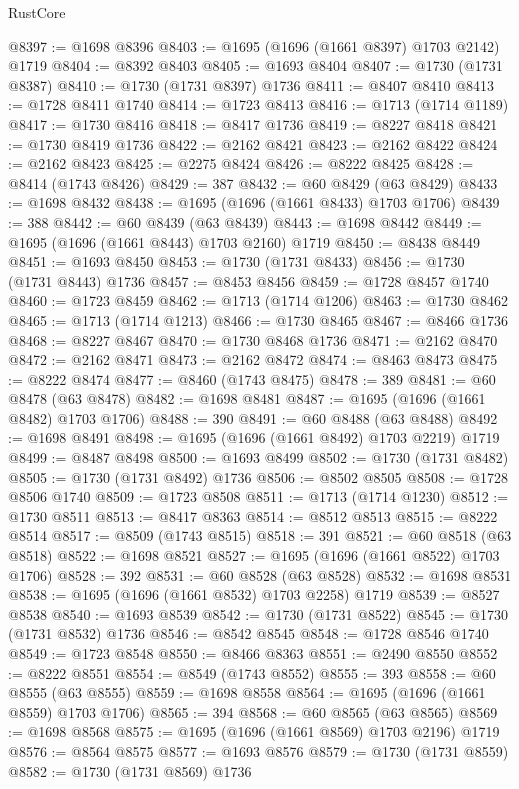 \begin{lexlean}{RustCore}
\begin{coremodule}
@8397 := @1698 @8396
@8403 := @1695 (@1696 (@1661 @8397) @1703 @2142) @1719
@8404 := @8392 @8403
@8405 := @1693 @8404
@8407 := @1730 (@1731 @8387)
@8410 := @1730 (@1731 @8397) @1736
@8411 := @8407 @8410
@8413 := @1728 @8411 @1740
@8414 := @1723 @8413
@8416 := @1713 (@1714 @1189)
@8417 := @1730 @8416
@8418 := @8417 @1736
@8419 := @8227 @8418
@8421 := @1730 @8419 @1736
@8422 := @2162 @8421
@8423 := @2162 @8422
@8424 := @2162 @8423
@8425 := @2275 @8424
@8426 := @8222 @8425
@8428 := @8414 (@1743 @8426)
@8429 := 387
@8432 := @60 @8429 (@63 @8429)
@8433 := @1698 @8432
@8438 := @1695 (@1696 (@1661 @8433) @1703 @1706)
@8439 := 388
@8442 := @60 @8439 (@63 @8439)
@8443 := @1698 @8442
@8449 := @1695 (@1696 (@1661 @8443) @1703 @2160) @1719
@8450 := @8438 @8449
@8451 := @1693 @8450
@8453 := @1730 (@1731 @8433)
@8456 := @1730 (@1731 @8443) @1736
@8457 := @8453 @8456
@8459 := @1728 @8457 @1740
@8460 := @1723 @8459
@8462 := @1713 (@1714 @1206)
@8463 := @1730 @8462
@8465 := @1713 (@1714 @1213)
@8466 := @1730 @8465
@8467 := @8466 @1736
@8468 := @8227 @8467
@8470 := @1730 @8468 @1736
@8471 := @2162 @8470
@8472 := @2162 @8471
@8473 := @2162 @8472
@8474 := @8463 @8473
@8475 := @8222 @8474
@8477 := @8460 (@1743 @8475)
@8478 := 389
@8481 := @60 @8478 (@63 @8478)
@8482 := @1698 @8481
@8487 := @1695 (@1696 (@1661 @8482) @1703 @1706)
@8488 := 390
@8491 := @60 @8488 (@63 @8488)
@8492 := @1698 @8491
@8498 := @1695 (@1696 (@1661 @8492) @1703 @2219) @1719
@8499 := @8487 @8498
@8500 := @1693 @8499
@8502 := @1730 (@1731 @8482)
@8505 := @1730 (@1731 @8492) @1736
@8506 := @8502 @8505
@8508 := @1728 @8506 @1740
@8509 := @1723 @8508
@8511 := @1713 (@1714 @1230)
@8512 := @1730 @8511
@8513 := @8417 @8363
@8514 := @8512 @8513
@8515 := @8222 @8514
@8517 := @8509 (@1743 @8515)
@8518 := 391
@8521 := @60 @8518 (@63 @8518)
@8522 := @1698 @8521
@8527 := @1695 (@1696 (@1661 @8522) @1703 @1706)
@8528 := 392
@8531 := @60 @8528 (@63 @8528)
@8532 := @1698 @8531
@8538 := @1695 (@1696 (@1661 @8532) @1703 @2258) @1719
@8539 := @8527 @8538
@8540 := @1693 @8539
@8542 := @1730 (@1731 @8522)
@8545 := @1730 (@1731 @8532) @1736
@8546 := @8542 @8545
@8548 := @1728 @8546 @1740
@8549 := @1723 @8548
@8550 := @8466 @8363
@8551 := @2490 @8550
@8552 := @8222 @8551
@8554 := @8549 (@1743 @8552)
@8555 := 393
@8558 := @60 @8555 (@63 @8555)
@8559 := @1698 @8558
@8564 := @1695 (@1696 (@1661 @8559) @1703 @1706)
@8565 := 394
@8568 := @60 @8565 (@63 @8565)
@8569 := @1698 @8568
@8575 := @1695 (@1696 (@1661 @8569) @1703 @2196) @1719
@8576 := @8564 @8575
@8577 := @1693 @8576
@8579 := @1730 (@1731 @8559)
@8582 := @1730 (@1731 @8569) @1736

\end{coremodule}
\end{lexlean}
